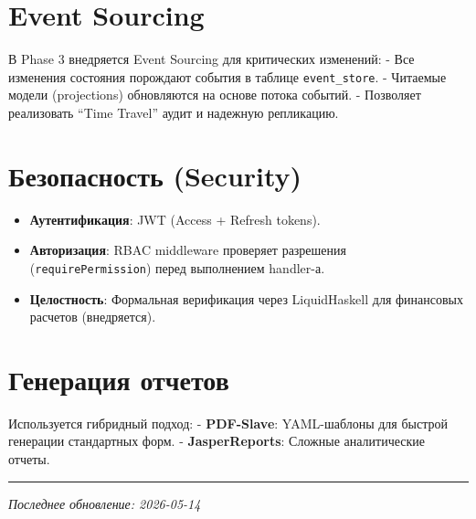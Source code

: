 \section{Event Sourcing}\label{event-sourcing}

В Phase 3 внедряется Event Sourcing для критических изменений: - Все
изменения состояния порождают события в таблице \texttt{event\_store}. -
Читаемые модели (projections) обновляются на основе потока событий. -
Позволяет реализовать ``Time Travel'' аудит и надежную репликацию.

\section{Безопасность
(Security)}\label{ux431ux435ux437ux43eux43fux430ux441ux43dux43eux441ux442ux44c-security}

\begin{itemize}
\tightlist
\item
  \textbf{Аутентификация}: JWT (Access + Refresh tokens).
\item
  \textbf{Авторизация}: RBAC middleware проверяет разрешения
  (\texttt{requirePermission}) перед выполнением handler-а.
\item
  \textbf{Целостность}: Формальная верификация через LiquidHaskell для
  финансовых расчетов (внедряется).
\end{itemize}

\section{Генерация
отчетов}\label{ux433ux435ux43dux435ux440ux430ux446ux438ux44f-ux43eux442ux447ux435ux442ux43eux432}

Используется гибридный подход: - \textbf{PDF-Slave}: YAML-шаблоны для
быстрой генерации стандартных форм. - \textbf{JasperReports}: Сложные
аналитические отчеты.

\begin{center}\rule{0.5\linewidth}{0.5pt}\end{center}

\emph{Последнее обновление: 2026-05-14}
